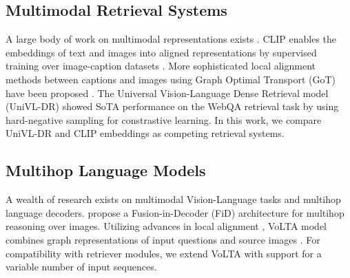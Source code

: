 


\subsection{Multimodal Retrieval Systems} 
A large body of work on multimodal representations exists \citep{liu2022universal,chen_murag_2022,radford2021learning}. 
CLIP enables the embeddings of text and images into aligned representations by supervised training over image-caption datasets \citep{radford2021learning}. More sophisticated local alignment methods between captions and images using Graph Optimal Transport (GoT) have been proposed \citep{chen_graph_2020,maretic_got_2019}. The Universal Vision-Language Dense Retrieval model (UniVL-DR) showed SoTA performance on the WebQA retrieval task \citep{liu2022universal} by using hard-negative sampling for constrastive learning. In this work, we compare UniVL-DR and CLIP embeddings as competing retrieval systems.




\subsection{Multihop Language Models} 
A wealth of research exists on multimodal Vision-Language tasks and multihop language decoders. \cite{tanaka_slidevqa_2023} propose a Fusion-in-Decoder (FiD) architecture for multihop reasoning over images. Utilizing advances in local alignment \citep{chen_graph_2020}, VoLTA model combines graph representations of input questions and source images \citep{pramanick_volta_2023}. For compatibility with retriever modules, we extend VoLTA with support for a variable number of input sequences. 

